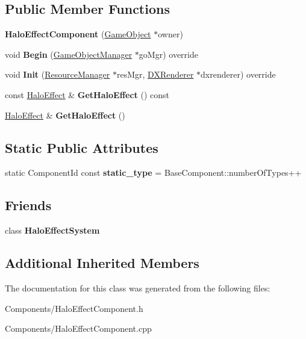 \subsection*{Public Member Functions}
\begin{DoxyCompactItemize}
\item 
\mbox{\label{classHaloEffectComponent_af20298bd795f9fb086590b1e74bfeaee}} 
{\bfseries Halo\+Effect\+Component} (\hyperlink{classGameObject}{Game\+Object} $\ast$owner)
\item 
\mbox{\label{classHaloEffectComponent_a1845e41e3c47faf344ee4842c3b25737}} 
void {\bfseries Begin} (\hyperlink{classGameObjectManager}{Game\+Object\+Manager} $\ast$go\+Mgr) override
\item 
\mbox{\label{classHaloEffectComponent_aa5ebc7c6bf980154f6ee203694ebb824}} 
void {\bfseries Init} (\hyperlink{classResourceManager}{Resource\+Manager} $\ast$res\+Mgr, \hyperlink{classDXRenderer}{D\+X\+Renderer} $\ast$dxrenderer) override
\item 
\mbox{\label{classHaloEffectComponent_a465079c2adf862183d9d44eb29de1aae}} 
const \hyperlink{classHaloEffect}{Halo\+Effect} \& {\bfseries Get\+Halo\+Effect} () const
\item 
\mbox{\label{classHaloEffectComponent_a332ff98a8ee9a183a4eaf30d55fef86e}} 
\hyperlink{classHaloEffect}{Halo\+Effect} \& {\bfseries Get\+Halo\+Effect} ()
\end{DoxyCompactItemize}
\subsection*{Static Public Attributes}
\begin{DoxyCompactItemize}
\item 
\mbox{\label{classHaloEffectComponent_a2c5ef701da0b919bcb6eef2415e9cc6b}} 
static Component\+Id const {\bfseries static\+\_\+type} = Base\+Component\+::number\+Of\+Types++
\end{DoxyCompactItemize}
\subsection*{Friends}
\begin{DoxyCompactItemize}
\item 
\mbox{\label{classHaloEffectComponent_a48ea1f3f3b0f91b58f6ccda709a96f69}} 
class {\bfseries Halo\+Effect\+System}
\end{DoxyCompactItemize}
\subsection*{Additional Inherited Members}


The documentation for this class was generated from the following files\+:\begin{DoxyCompactItemize}
\item 
Components/Halo\+Effect\+Component.\+h\item 
Components/Halo\+Effect\+Component.\+cpp\end{DoxyCompactItemize}

